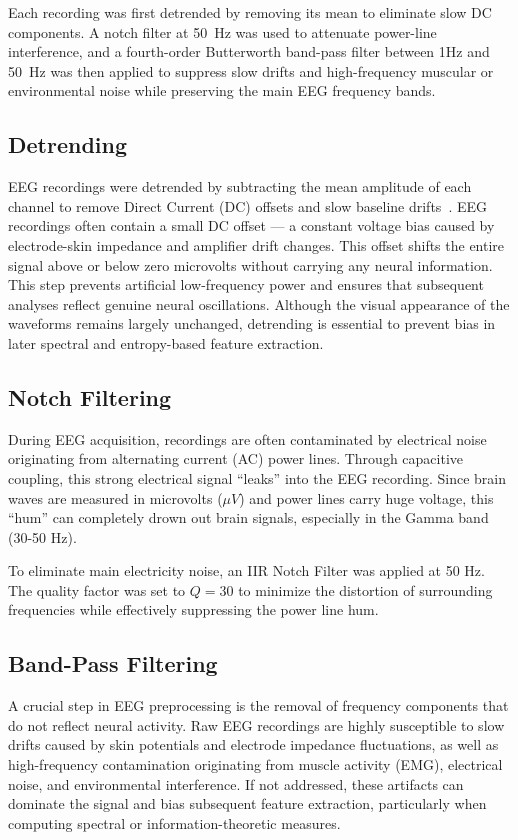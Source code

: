 \documentclass[11pt,a4paper]{article}
\begin{document}
Each recording was first detrended by removing its mean to eliminate slow DC components. A notch filter at 50~Hz was used to attenuate 
power-line interference, and a fourth-order Butterworth band-pass filter between 1Hz and 50~Hz was then applied to suppress slow drifts 
and high-frequency muscular or environmental noise while preserving the main EEG frequency bands.


\subsection{Detrending}\label{sec:detrending}
EEG recordings were detrended by subtracting the mean amplitude of each channel to remove Direct Current (DC) offsets and slow baseline 
drifts~\cite{de2018robust}. EEG recordings often contain a small DC offset — a constant voltage bias caused by electrode-skin impedance 
and amplifier drift changes. This offset shifts the entire signal above or below zero microvolts without carrying any neural information. 
This step prevents artificial low-frequency power and ensures that subsequent analyses reflect genuine neural oscillations. Although the 
visual appearance of the waveforms remains largely unchanged, detrending is essential to prevent bias in later spectral and entropy-based 
feature extraction.


\subsection{Notch Filtering}\label{sec:notch}
During EEG acquisition, recordings are often contaminated by electrical noise originating from alternating current (AC) power lines.
Through capacitive coupling, this strong electrical signal ``leaks'' into the EEG recording. Since brain waves are measured in microvolts 
($\mu V$) and power lines carry huge voltage, this ``hum'' can completely drown out brain signals, especially in the Gamma band (30-50 Hz).

To eliminate main electricity noise, an IIR Notch Filter was applied at 50 Hz. The quality factor was set to $Q = 30$ to minimize the 
distortion of surrounding frequencies while effectively suppressing the power line hum.


\subsection{Band-Pass Filtering}\label{sec:bandpass}
A crucial step in EEG preprocessing is the removal of frequency components that do not reflect neural activity. Raw EEG recordings are highly 
susceptible to slow drifts caused by skin potentials and electrode impedance fluctuations, as well as high-frequency contamination originating 
from muscle activity (EMG), electrical noise, and environmental interference. If not addressed, these artifacts can dominate the signal and 
bias subsequent feature extraction, particularly when computing spectral or information-theoretic measures.
\end{document}
